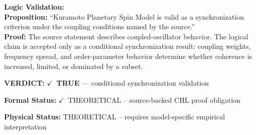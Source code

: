 \textbf{Logic Validation:}\\
\textbf{Proposition:} ``Kuramoto Planetary Spin Model is valid as a synchronization criterion under the coupling
conditions named by the source.''\\
\textbf{Proof:} The source statement describes coupled-oscillator behavior. The logical claim is
accepted only as a conditional synchronization result: coupling weights, frequency
spread, and order-parameter behavior determine whether coherence is increased, limited,
or dominated by a subset.

\textbf{VERDICT:} \ensuremath{\checkmark}\ \textbf{TRUE} --- conditional synchronization validation

\textbf{Formal Status:} \ensuremath{\checkmark}\ THEORETICAL -- source-backed CHL proof obligation

\textbf{Physical Status:} THEORETICAL -- requires model-specific empirical interpretation
\par\vspace{0.45em}
\par
\ifTZPDarkEdition
{}
\fi
\endgroup
\endgroup
